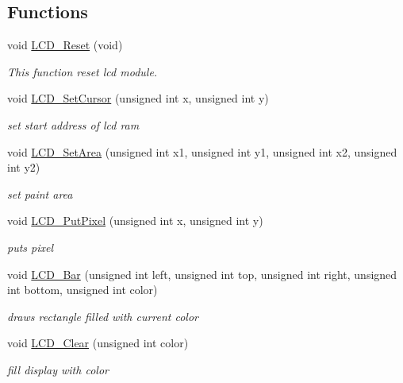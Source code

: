 \subsection*{Functions}
\begin{DoxyCompactItemize}
\item 
void \hyperlink{group___s_s_d1289_ga8415c163ade706484e9bd7e65d69a975}{L\+C\+D\+\_\+\+Reset} (void)
\begin{DoxyCompactList}\small\item\em This function reset lcd module. \end{DoxyCompactList}\item 
void \hyperlink{group___s_s_d1289_gad1acded161cfdfc338c8aa8cfc55cb84}{L\+C\+D\+\_\+\+Set\+Cursor} (unsigned int x, unsigned int y)
\begin{DoxyCompactList}\small\item\em set start address of lcd ram \end{DoxyCompactList}\item 
void \hyperlink{group___s_s_d1289_gae82c2502fde8414761fed4988062bc21}{L\+C\+D\+\_\+\+Set\+Area} (unsigned int x1, unsigned int y1, unsigned int x2, unsigned int y2)
\begin{DoxyCompactList}\small\item\em set paint area \end{DoxyCompactList}\item 
void \hyperlink{group___s_s_d1289_ga1e7159fb1589ae14a93d4b8e5503a571}{L\+C\+D\+\_\+\+Put\+Pixel} (unsigned int x, unsigned int y)
\begin{DoxyCompactList}\small\item\em puts pixel \end{DoxyCompactList}\item 
void \hyperlink{group___s_s_d1289_ga69b45f8c8ad7e99e27138691149cd1f9}{L\+C\+D\+\_\+\+Bar} (unsigned int left, unsigned int top, unsigned int right, unsigned int bottom, unsigned int color)
\begin{DoxyCompactList}\small\item\em draws rectangle filled with current color \end{DoxyCompactList}\item 
void \hyperlink{group___s_s_d1289_ga717bc21df8d87525158f373d9e25ca8a}{L\+C\+D\+\_\+\+Clear} (unsigned int color)
\begin{DoxyCompactList}\small\item\em fill display with color \end{DoxyCompactList}\item 

\end{DoxyCompactItemize}
